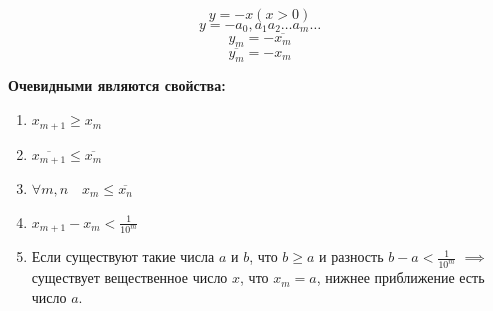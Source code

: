 \documentclass[a4paper,oneside]{article}
\theoremstyle{definition}
\theoremstyle{definition}
\theoremstyle{definition}
\begin{document}
\[y = -x (x > 0)\]
\[y = -a_0,a_1 a_2 \dots a_m \dots\]
\[y_m = -\overline{x_m}\]
\[\overline{y_m} = -x_m\]

\textbf{Очевидными являются свойства:}
\begin{enumerate}
    \item $x_{m+1} \ge x_m$
    \item $\overline{x_{m+1}} \le \overline{x_m}$
    \item $\forall m,n \quad x_m \le \overline{x_n}$
    \item $x_{m+1} - x_m < \frac{1}{10^m}$
    \item Если существуют такие числа $a$ и $b$, что $b \ge a$
    и разность $b - a < \frac{1}{10^m}$ $\implies$ существует
    вещественное число $x$, что $x_m = a$, нижнее приближение есть число $a$.
\end{enumerate}
\end{document}

